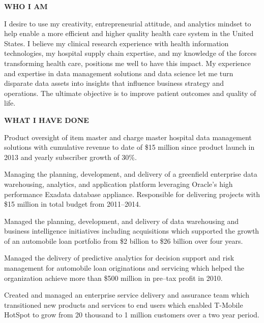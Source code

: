 \documentclass{article}
\newcommand{\sbt}{\,\begin{picture}(-1,1)(-1,-3)\circle*{3}\end{picture}\ }
\newenvironment{tightcenter}{%
  \setlength\topsep{0pt}
  \setlength\parskip{10pt}
  \begin{center}
}{%
  \end{center}
}
\begin{document}
\begin{tightcenter}
{\bfseries \large WHO I AM}
\end{tightcenter}

\noindent
I desire to use my creativity, entrepreneurial attitude, and analytics mindset to help enable a more efficient and higher quality health care system in the United States. I believe my clinical research experience with health information technologies, my hospital supply chain expertise, and my knowledge of the forces transforming health care,  positions me well to have this impact. My experience and expertise in data management solutions and data science let me turn disparate data assets into insights that influence business strategy and operations. The ultimate objective is to improve patient outcomes and quality of life.

\begin{tightcenter}
{\bfseries \large WHAT I HAVE DONE}
\end{tightcenter}

\begin{compactitem}

\item[\sbt] Product oversight of item master and charge master hospital data management solutions with cumulative revenue to date of \$15 million since product launch in 2013 and yearly subscriber growth of 30\%.
\item[\sbt] Managing the planning, development, and delivery of a greenfield enterprise data warehousing, analytics, and application platform leveraging Oracle's high performance Exadata database appliance. Responsible for delivering projects with \$15 million in total budget from 2011--2014.
\item[\sbt] Managed the planning, development, and delivery of data warehousing and business intelligence initiatives including acquisitions which supported the growth of an automobile loan portfolio from \$2 billion to \$26 billion over four years.
\item[\sbt] Managed the delivery of predictive analytics for decision support and risk management for automobile loan originations and servicing which helped the organization achieve more than \$500 million in pre--tax profit in 2010.
\item[\sbt] Created and managed an enterprise service delivery and assurance team which transitioned new products and services to end users which enabled T-Mobile HotSpot to grow from 20 thousand to 1 million customers over a two year period.

\end{compactitem}
\end{document}
